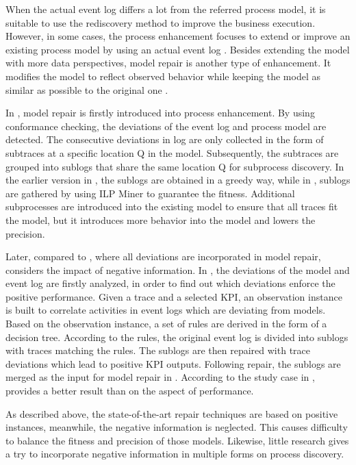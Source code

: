 When the actual event log differs a lot from the referred process model, it is suitable to use the rediscovery method to improve the business execution. However, in some cases, the process enhancement focuses to extend or improve an existing process model by using an actual event log \cite{van2011process}. Besides extending the model with more data perspectives, model repair is another type of enhancement. It modifies the model to reflect observed behavior while keeping the model as similar as possible to the original one \cite{fahland2012repairing}.

In  \cite{fahland2012repairing}, model repair is firstly introduced into process enhancement. By using conformance checking, the deviations of the event log and process model are detected. The consecutive deviations in log  are only collected in the form of subtraces at a specific location Q in the model. Subsequently, the subtraces are grouped into sublogs that share the same location Q for subprocess discovery. In the earlier version in  \cite{fahland2012repairing}, the sublogs are obtained in a greedy way, while in  \cite{fahland2015model}, sublogs are gathered by using ILP Miner to guarantee the fitness. Additional subprocesses are introduced into the existing model to ensure that all traces fit the model, but it introduces more behavior into the model and lowers the precision.

Later, compared to  \cite{fahland2012repairing, fahland2015model}, where all deviations are incorporated in model repair,  \cite{dees2017enhancing} considers the impact of negative information.  In  \cite{dees2017enhancing}, the deviations of the model and event log are firstly analyzed, in order to find out which deviations enforce the positive performance. Given a trace and a selected KPI, an observation instance is built to correlate  activities in event logs which are deviating from models. Based on the observation instance,  a set of rules are derived in the form of a decision tree. According to the rules, the original event log is divided into sublogs with traces matching the rules. The sublogs are then repaired with trace deviations which lead to positive KPI outputs. Following repair, the sublogs are merged as the input for model repair in  \cite{fahland2015model}. According to the study case in  \cite{dees2017enhancing}, \cite{dees2017enhancing} provides a better result than  \cite{fahland2015model} on the aspect of performance. 
 
As described above, the state-of-the-art repair techniques are based on positive instances, meanwhile, the negative information is neglected. This causes difficulty to balance the fitness and precision of those models. Likewise, little research gives a try to incorporate negative information in multiple forms on process discovery.

